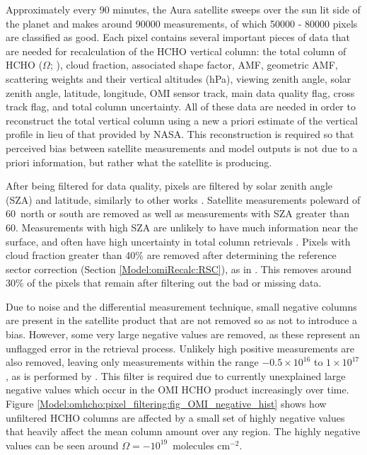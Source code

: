     Approximately every $90$ minutes, the Aura satellite sweeps over the sun lit side of the planet and makes around 90000 measurements, of which 50000 - 80000 pixels are classified as good.
    Each pixel contains several important pieces of data that are needed for recalculation of the HCHO vertical column: the total column of HCHO ($\Omega$; \moleccm), cloud fraction, associated shape factor, AMF, geometric AMF, scattering weights and their vertical altitudes (hPa), viewing zenith angle, solar zenith angle, latitude, longitude, OMI sensor track, main data quality flag, cross track flag, and total column uncertainty.
    All of these data are needed in order to reconstruct the total vertical column using a new a priori estimate of the vertical profile in lieu of that provided by NASA.
    This reconstruction is required so that perceived bias between satellite measurements and model outputs is not due to a priori information, but rather what the satellite is producing.
    
    After being filtered for data quality, pixels are filtered by solar zenith angle (SZA) and latitude, similarly to other works \parencite[e.g.,][]{Marais2012, Barkley2013, Zhu2014, Bauwens2016, Zhu2016}.
    Satellite measurements poleward of 60\degr ~north or south are removed as well as measurements with SZA greater than 60\degr.
    Measurements with high SZA are unlikely to have much information near the surface, and often have high uncertainty in total column retrievals \parencite[e.g.,][]{Stone2015}.
    Pixels with cloud fraction greater than 40\% are removed after determining the reference sector correction (Section \ref{Model:omiRecalc:RSC}), as in \textcite{Abad2015, DeSmedt2015}.
    This removes around 30\% of the pixels that remain after filtering out the bad or missing data.

    Due to noise and the differential measurement technique, small negative columns are present in the satellite product that are not removed so as not to introduce a bias.
    However, some very large negative values are removed, as these represent an unflagged error in the retrieval process.
    Unlikely high positive measurements are also removed, leaving only measurements within the range $-0.5 \times 10^{16}$ to $1 \times 10^{17} $\moleccm, as is performed by \textcite{Zhu2016}.
    This filter is required due to currently unexplained large negative values which occur in the OMI HCHO product increasingly over time.
    Figure \ref{Model:omhcho:pixel_filtering:fig_OMI_negative_hist} shows how unfiltered HCHO columns are affected by a small set of highly negative values that heavily affect the mean column amount over any region.
    The highly negative values can be seen around $\Omega = -10^{19}$~molecules cm$^{-2}$.
    

